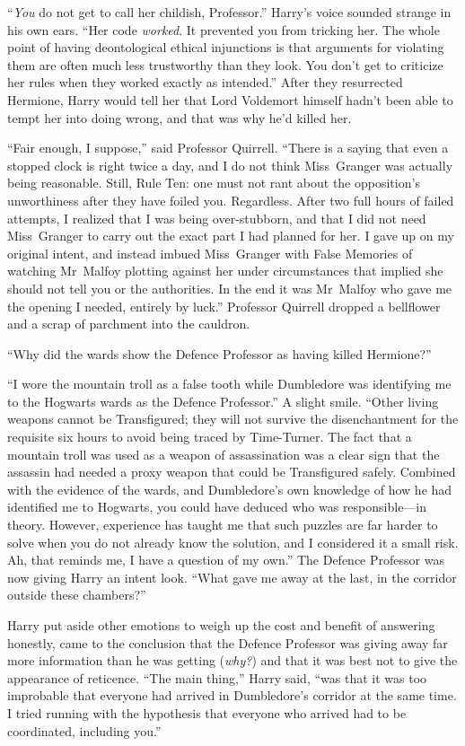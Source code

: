 “\emph{You} do not get to call her childish, Professor.” Harry’s voice sounded strange in his own ears. “Her code \emph{worked}. It prevented you from tricking her. The whole point of having deontological ethical injunctions is that arguments for violating them are often much less trustworthy than they look. You don’t get to criticize her rules when they worked exactly as intended.” After they resurrected Hermione, Harry would tell her that Lord Voldemort himself hadn’t been able to tempt her into doing wrong, and that was why he’d killed her.

“Fair enough, I suppose,” said Professor Quirrell. “There is a saying that even a stopped clock is right twice a day, and I do not think Miss~Granger was actually being reasonable. Still, Rule Ten: one must not rant about the opposition’s unworthiness after they have foiled you. Regardless. After two full hours of failed attempts, I realized that I was being over-stubborn, and that I did not need Miss~Granger to carry out the exact part I had planned for her. I gave up on my original intent, and instead imbued Miss~Granger with False Memories of watching Mr~Malfoy plotting against her under circumstances that implied she should not tell you or the authorities. In the end it was Mr~Malfoy who gave me the opening I needed, entirely by luck.” Professor Quirrell dropped a bellflower and a scrap of parchment into the cauldron.

“Why did the wards show the Defence Professor as having killed Hermione?”

“I wore the mountain troll as a false tooth while Dumbledore was identifying me to the Hogwarts wards as the Defence Professor.” A slight smile. “Other living weapons cannot be Transfigured; they will not survive the disenchantment for the requisite six hours to avoid being traced by Time-Turner. The fact that a mountain troll was used as a weapon of assassination was a clear sign that the assassin had needed a proxy weapon that could be Transfigured safely. Combined with the evidence of the wards, and Dumbledore’s own knowledge of how he had identified me to Hogwarts, you could have deduced who was responsible—in theory. However, experience has taught me that such puzzles are far harder to solve when you do not already know the solution, and I considered it a small risk. Ah, that reminds me, I have a question of my own.” The Defence Professor was now giving Harry an intent look. “What gave me away at the last, in the corridor outside these chambers?”

Harry put aside other emotions to weigh up the cost and benefit of answering honestly, came to the conclusion that the Defence Professor was giving away far more information than he was getting (\emph{why?}) and that it was best not to give the appearance of reticence. “The main thing,” Harry said, “was that it was too improbable that everyone had arrived in Dumbledore’s corridor at the same time. I tried running with the hypothesis that everyone who arrived had to be coordinated, including you.”

